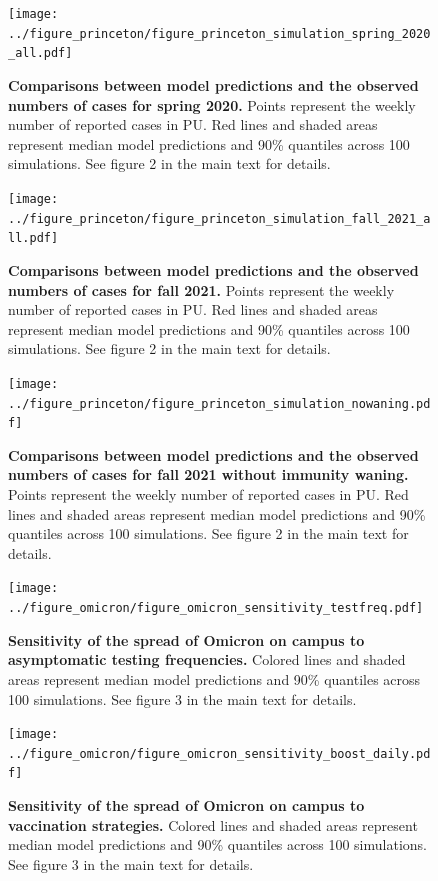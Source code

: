 \documentclass[12pt]{article}
\begin{document}
\pagebreak

\begin{figure}[!htp]
\texttt{[image: ../figure\_princeton/figure\_princeton\_simulation\_spring\_2020\_all.pdf]}
\caption{
\textbf{Comparisons between model predictions and the observed numbers of cases for spring 2020.}
Points represent the weekly number of reported cases in PU.
Red lines and shaded areas represent median model predictions and 90\% quantiles across 100 simulations.
See figure 2 in the main text for details.
}
\end{figure}


\pagebreak

\begin{figure}[!htp]
\texttt{[image: ../figure\_princeton/figure\_princeton\_simulation\_fall\_2021\_all.pdf]}
\caption{
\textbf{Comparisons between model predictions and the observed numbers of cases for fall 2021.}
Points represent the weekly number of reported cases in PU.
Red lines and shaded areas represent median model predictions and 90\% quantiles across 100 simulations.
See figure 2 in the main text for details.
}
\end{figure}

\pagebreak

\begin{figure}[!htp]
\texttt{[image: ../figure\_princeton/figure\_princeton\_simulation\_nowaning.pdf]}
\caption{
\textbf{Comparisons between model predictions and the observed numbers of cases for fall 2021 without immunity waning.}
Points represent the weekly number of reported cases in PU.
Red lines and shaded areas represent median model predictions and 90\% quantiles across 100 simulations.
See figure 2 in the main text for details.
}
\end{figure}

\pagebreak

\begin{figure}[!htp]
\texttt{[image: ../figure\_omicron/figure\_omicron\_sensitivity\_testfreq.pdf]}
\caption{
\textbf{Sensitivity of the spread of Omicron on campus to asymptomatic testing frequencies.}
Colored lines and shaded areas represent median model predictions and 90\% quantiles across 100 simulations.
See figure 3 in the main text for details.
}
\end{figure}

\pagebreak

\begin{figure}[!htp]
\texttt{[image: ../figure\_omicron/figure\_omicron\_sensitivity\_boost\_daily.pdf]}
\caption{
\textbf{Sensitivity of the spread of Omicron on campus to vaccination strategies.}
Colored lines and shaded areas represent median model predictions and 90\% quantiles across 100 simulations.
See figure 3 in the main text for details.
}
\end{figure}
\end{document}
